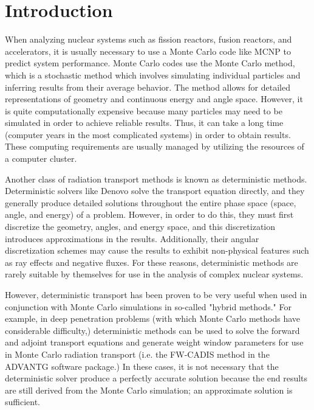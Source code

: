 \chapter{Introduction}
\label{chap:intro}

When analyzing nuclear systems such as fission reactors, fusion reactors, and accelerators, it is usually necessary to use a Monte Carlo code like MCNP \cite{mcnp620} to predict system performance.
Monte Carlo codes use the Monte Carlo method, which is a stochastic method which involves simulating individual particles and inferring results from their average behavior.
The method allows for detailed representations of geometry and continuous energy and angle space.
However, it is quite computationally expensive because many particles may need to be simulated in order to achieve reliable results.
Thus, it can take a long time (computer years in the most complicated systems) in order to obtain results.
These computing requirements are usually managed by utilizing the resources of a computer cluster.

Another class of radiation transport methods is known as deterministic methods.
Deterministic solvers like Denovo \cite{denovo} solve the transport equation directly, and they generally produce detailed solutions throughout the entire phase space (space, angle, and energy) of a problem.
However, in order to do this, they must first discretize the geometry, angles, and energy space, and this discretization introduces approximations in the results.
Additionally, their angular discretization schemes may cause the results to exhibit non-physical features such as ray effects and negative fluxes.
For these reasons, deterministic methods are rarely suitable by themselves for use in the analysis of complex nuclear systems.

However, deterministic transport has been proven to be very useful when used in conjunction with Monte Carlo simulations in so-called "hybrid methods."
For example, in deep penetration problems (with which Monte Carlo methods have considerable difficulty,) deterministic methods can be used to solve the forward and adjoint transport equations and generate weight window parameters for use in Monte Carlo radiation transport (i.e. the FW-CADIS method \cite{fwcadis} in the ADVANTG \cite{advantg} software package.)
In these cases, it is not necessary that the deterministic solver produce a perfectly accurate solution because the end results are still derived from the Monte Carlo simulation; an approximate solution is sufficient.

